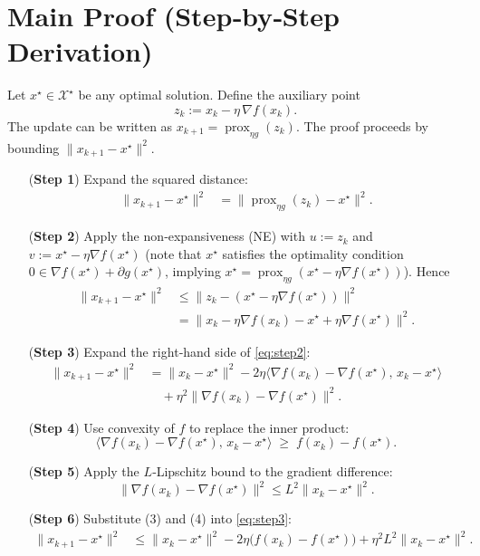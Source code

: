 \documentclass{article}
\newcommand{\prox}{\operatorname{prox}}
\newcommand{\grad}{\nabla}
\begin{document}
\section*{Main Proof (Step‑by‑Step Derivation)}
Let $x^\star\in\mathcal{X}^\star$ be any optimal solution. Define the auxiliary point
\[
z_k := x_k - \eta \,\grad f(x_k) .
\]
The update can be written as $x_{k+1}= \prox_{\eta g}(z_k)$. The proof proceeds by bounding $ \|x_{k+1}-x^\star\|^2 $.

\begin{enumerate}
\item[(\textbf{Step 1})] Expand the squared distance:
\begin{align}
\|x_{k+1}-x^\star\|^2
&= \|\prox_{\eta g}(z_k)-x^\star\|^2 . \label{eq:step1}
\end{align}
\item[(\textbf{Step 2})] Apply the non‑expansiveness (NE) with $u:=z_k$ and $v:=x^\star-\eta\grad f(x^\star)$ (note that $x^\star$ satisfies the optimality condition $0\in\grad f(x^\star)+\partial g(x^\star)$, implying $x^\star=\prox_{\eta g}(x^\star-\eta\grad f(x^\star))$). Hence
\begin{align}
\|x_{k+1}-x^\star\|^2 
&\le \|z_k-(x^\star-\eta\grad f(x^\star))\|^2 \nonumber\\
&= \|x_k-\eta\grad f(x_k)-x^\star+\eta\grad f(x^\star)\|^2 . \label{eq:step2}
\end{align}
\item[(\textbf{Step 3})] Expand the right‑hand side of \eqref{eq:step2}:
\begin{align}
\|x_{k+1}-x^\star\|^2
&= \|x_k-x^\star\|^2 -2\eta\langle \grad f(x_k)-\grad f(x^\star),\,x_k-x^\star\rangle \nonumber\\
&\quad +\eta^2\|\grad f(x_k)-\grad f(x^\star)\|^2 . \label{eq:step3}
\end{align}
\item[(\textbf{Step 4})] Use convexity of $f$ to replace the inner product:
\[
\langle \grad f(x_k)-\grad f(x^\star),\,x_k-x^\star\rangle 
\;\ge\; f(x_k)-f(x^\star) . \tag{3}
\]
\item[(\textbf{Step 5})] Apply the $L$‑Lipschitz bound to the gradient difference:
\[
\|\grad f(x_k)-\grad f(x^\star)\|^2 \le L^2\|x_k-x^\star\|^2 . \tag{4}
\]
\item[(\textbf{Step 6})] Substitute (3) and (4) into \eqref{eq:step3}:
\begin{align}
\|x_{k+1}-x^\star\|^2
&\le \|x_k-x^\star\|^2 -2\eta\bigl(f(x_k)-f(x^\star)\bigr) +\eta^2 L^2\|x_k-x^\star\|^2 .

\end{align}
\end{enumerate}
\end{document}
